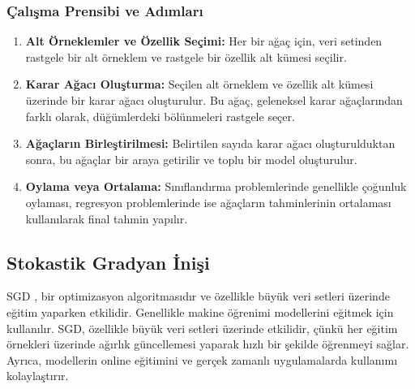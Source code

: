 \subsubsection{Çalışma Prensibi ve Adımları}
\begin{enumerate}
\item \textbf{Alt Örneklemler ve Özellik Seçimi:} Her bir ağaç için, veri setinden rastgele bir alt örneklem ve rastgele bir özellik alt kümesi seçilir.
\item \textbf{Karar Ağacı Oluşturma:} Seçilen alt örneklem ve özellik alt kümesi üzerinde bir karar ağacı oluşturulur. Bu ağaç, geleneksel karar ağaçlarından farklı olarak, düğümlerdeki bölünmeleri rastgele seçer.
\item \textbf{Ağaçların Birleştirilmesi:} Belirtilen sayıda karar ağacı oluşturulduktan sonra, bu ağaçlar bir araya getirilir ve toplu bir model oluşturulur.
\item \textbf{Oylama veya Ortalama:} Sınıflandırma problemlerinde genellikle çoğunluk oylaması, regresyon problemlerinde ise ağaçların tahminlerinin ortalaması kullanılarak final tahmin yapılır.
\end{enumerate}

\subsection{Stokastik Gradyan İnişi}
SGD , bir optimizasyon algoritmasıdır ve özellikle büyük veri setleri üzerinde eğitim yaparken etkilidir. Genellikle makine öğrenimi modellerini eğitmek için kullanılır. SGD, özellikle büyük veri setleri üzerinde etkilidir, çünkü her eğitim örnekleri üzerinde ağırlık güncellemesi yaparak hızlı bir şekilde öğrenmeyi sağlar. Ayrıca, modellerin online eğitimini ve gerçek zamanlı uygulamalarda kullanımı kolaylaştırır.


